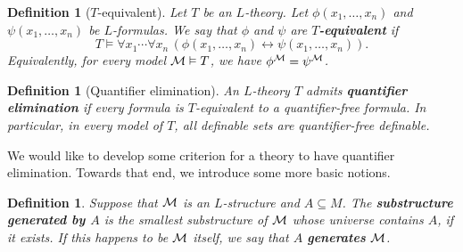 \documentclass[10pt]{article}
\theoremstyle{newstyle}
\newtheorem{defn}[thm]{Definition}
\begin{document}
\begin{defn}[$T$-equivalent]
Let $T$ be an $L$-theory. Let $\phi(x_1, \dots, x_n)$ and $\psi(x_1, \dots, x_n)$ be 
$L$-formulas. We say that $\phi$ and $\psi$ are {\bf $T$-equivalent} if 
\[ T \vDash \forall x_1 \cdots \forall x_n \, (\phi(x_1, \dots, x_n) \leftrightarrow 
\psi(x_1, \dots, x_n)). \] 
Equivalently, for every model ${\cal M} \vDash T$, we have $\phi^{\cal M} = \psi^{\cal M}$. 
\end{defn}

\begin{defn}[Quantifier elimination]
An $L$-theory $T$ admits {\bf quantifier elimination} if every formula is $T$-equivalent to 
a quantifier-free formula. In particular, in every model of $T$, all definable sets are 
quantifier-free definable.
\end{defn}

We would like to develop some criterion for a theory to have quantifier elimination. 
Towards that end, we introduce some more basic notions. 

\begin{defn}
Suppose that ${\cal M}$ is an $L$-structure and $A \subseteq M$. The 
{\bf substructure generated by $A$} is the smallest substructure of ${\cal M}$ whose 
universe contains $A$, if it exists. If this happens to be ${\cal M}$ itself, we say that 
$A$ {\bf generates} ${\cal M}$.
\end{defn}
\end{document}
